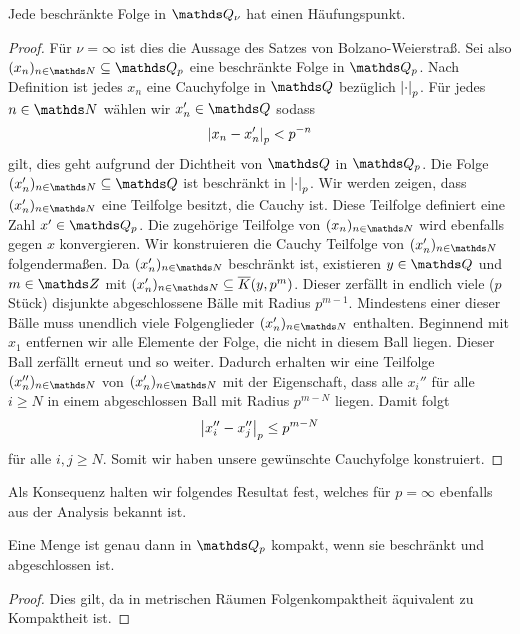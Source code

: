 \begin{thm}
Jede beschränkte Folge in $\Q_\nu$ hat einen Häufungspunkt.
\begin{proof}
Für $\nu=\infty$ ist dies die Aussage des Satzes von Bolzano-Weierstraß.
Sei also $(x_n)_{n\in \N} \subseteq \Q_p$ eine beschränkte Folge in $\Q_p$.
Nach Definition ist jedes $x_n$ eine Cauchyfolge in $\Q$ bezüglich $\left\vert\cdot\right\vert_p$.
Für jedes $n \in \N$ wählen wir $x_n' \in \Q$ sodass
\begin{align*}
\left\vert x_n-x_n'\right\vert_p<p^{-n}
\end{align*}
gilt, dies geht aufgrund der Dichtheit von $\Q$ in $\Q_p$.
Die Folge $(x_n')_{n\in \N}\subseteq \Q$ ist beschränkt in $\left\vert\cdot\right\vert_p$.
Wir werden zeigen, dass $(x_n')_{n\in \N}$ eine Teilfolge besitzt, die Cauchy ist.
Diese Teilfolge definiert eine Zahl $x'\in \Q_p$.
Die zugehörige Teilfolge von $(x_n)_{n\in \N}$ wird ebenfalls gegen $x$ konvergieren.
Wir konstruieren die Cauchy Teilfolge von $(x_n')_{n\in \N}$ folgendermaßen.
Da $(x_n')_{n \in \N}$ beschränkt ist, existieren $y \in \Q$ und $m\in \Z$ mit $(x_n')_{n\in \N}\subseteq \overline{K}(y,p^m)$. Dieser zerfällt in endlich viele ($p$ Stück) disjunkte abgeschlossene Bälle mit Radius $p^{m-1}$.
Mindestens einer dieser Bälle muss unendlich viele Folgenglieder $(x_n')_{n\in \N}$ enthalten.
Beginnend mit $x_1$ entfernen wir alle Elemente der Folge, die nicht in diesem Ball liegen.
Dieser Ball zerfällt erneut und so weiter.
Dadurch erhalten wir eine Teilfolge $(x_n'')_{n\in \N}$ von $(x_n')_{n\in \N} $ mit der Eigenschaft,
dass alle $x_i''$ für alle $i\geq N$ in einem abgeschlossen Ball
mit Radius $p^{m-N}$ liegen. Damit folgt
\begin{align*}
\left\vert x_i''-x_j''\right\vert_p\leq p^{m-N}
\end{align*}
für alle $i,j\geq N$. Somit wir haben unsere gewünschte Cauchyfolge konstruiert.
\end{proof}
\end{thm}

Als Konsequenz halten wir folgendes Resultat fest, welches für $p=\infty$ ebenfalls aus der Analysis bekannt ist.

\begin{cor}
Eine Menge ist genau dann in $\Q_p$ kompakt, wenn sie beschränkt und abgeschlossen ist.
\end{cor}
\begin{proof}
Dies gilt, da in metrischen Räumen Folgenkompaktheit äquivalent zu Kompaktheit ist.
\end{proof}

